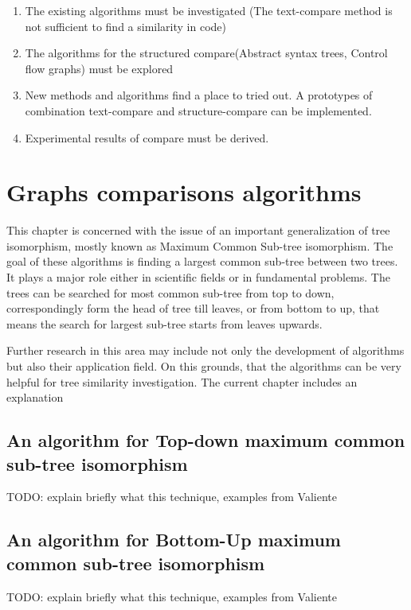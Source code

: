 \documentclass{report}
\begin{document}
\begin{enumerate}
  \item The existing algorithms must be investigated (The text-compare method is not sufficient to find a similarity in code)
  \item The algorithms for the structured compare(Abstract syntax trees, Control flow graphs) must be explored 
  \item New methods and algorithms find a place to tried out. A prototypes of combination text-compare and structure-compare can be implemented.
  \item Experimental results of compare must be derived.
\end{enumerate}

\chapter{Graphs comparisons algorithms}
\label{cha:algorithms-to-compare}

This chapter is concerned with the issue of an important generalization of tree isomorphism, mostly known as Maximum Common Sub-tree isomorphism. The goal of these algorithms is finding a largest common sub-tree between two trees. It plays a major role either in scientific fields or in fundamental problems. The trees can be searched for most common sub-tree from top to down, correspondingly form the head of tree till leaves, or from bottom to up, that means the search for largest sub-tree starts from leaves upwards.

Further research in this area may include not only the development of algorithms but also their application field. On this grounds, that the algorithms can be very helpful for tree similarity investigation. The current chapter includes an explanation 

\section{An algorithm for Top-down maximum common sub-tree isomorphism }
\label{sec:topdown}

TODO: explain briefly what this technique, examples from Valiente

\section{An algorithm for Bottom-Up maximum common sub-tree isomorphism }
\label{sec:bottomup}
TODO: explain briefly what this technique, examples from Valiente
\end{document}
